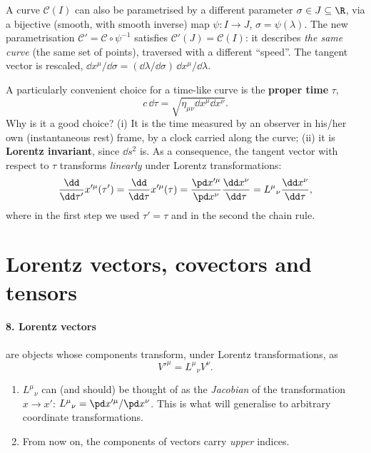 \begin{remarkbox}[Reparametrisations]
A curve $\mathcal C(I)$ can also be parametrised by a different parameter $\sigma\in J\subseteq\R$, via a bijective (smooth, with smooth inverse) map $\psi:I\to J$, $\sigma=\psi(\lambda)$. The new parametrisation $\mathcal C'=\mathcal C\circ\psi^{-1}$ satisfies $\mathcal C'(J)=\mathcal C(I)$: it describes \emph{the same curve} (the same set of points), traversed with a different ``speed''. The tangent vector is rescaled, $\dd x^\mu/\dd\sigma=(\dd\lambda/\dd\sigma)\,\dd x^\mu/\dd\lambda$.
\end{remarkbox}

A particularly convenient choice for a time-like curve is the \textbf{proper time} $\tau$,
\begin{equation}
  c\,\dd\tau=\sqrt{\eta_{\mu\nu}\dd x^\mu\dd x^\nu}.
\end{equation}
Why is it a good choice? (i) It is the time measured by an observer in his/her own (instantaneous rest) frame, by a clock carried along the curve; (ii) it is \textbf{Lorentz invariant}, since $\dd s^2$ is. As a consequence, the tangent vector with respect to $\tau$ transforms \emph{linearly} under Lorentz transformations:
\begin{equation}
  \frac{\dd}{\dd\tau'}x'^\mu(\tau')=\frac{\dd}{\dd\tau}x'^\mu(\tau)
  =\frac{\pd x'^\mu}{\pd x^\nu}\frac{\dd x^\nu}{\dd\tau}=L^\mu{}_\nu\frac{\dd x^\nu}{\dd\tau},
\end{equation}
where in the first step we used $\tau'=\tau$ and in the second the chain rule.

\section{Lorentz vectors, covectors and tensors}

\paragraph{8. Lorentz vectors} are objects whose components transform, under Lorentz transformations, as
\begin{equation}
  V'^\mu=L^\mu{}_\nu V^\nu .
\end{equation}
\begin{remarkbox}[Remarks]
\begin{enumerate}[nosep]
\item $L^\mu{}_\nu$ can (and should) be thought of as the \emph{Jacobian} of the transformation $x\to x'$: $L^\mu{}_\nu=\pd x'^\mu/\pd x^\nu$. This is what will generalise to arbitrary coordinate transformations.
\item From now on, the components of vectors carry \emph{upper} indices.
\end{enumerate}
\end{remarkbox}

